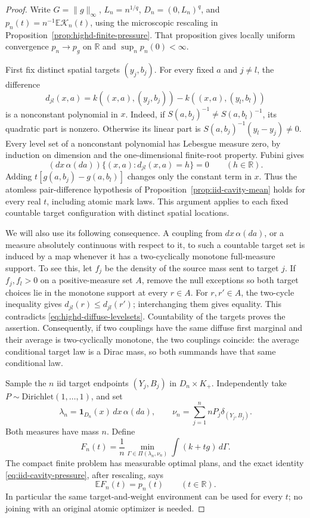 \documentclass[11pt,reqno]{amsart}
\theoremstyle{definition}
\theoremstyle{remark}
\numberwithin{equation}{section}
\newcommand{\R}{\mathbb R}
\newcommand{\E}{\mathbb E}
\begin{document}
\begin{proof}
Write \(G=\|g\|_\infty\), \(L_n=n^{1/q}\),
\(D_n=(0,L_n)^q\), and
\(p_n(t)=n^{-1}\E\mathcal K_n(t)\), using the microscopic
rescaling in Proposition~\ref{prop:highd-finite-pressure}.
That proposition gives locally uniform convergence
\(p_n\to p_g\) on \(\R\) and \(\sup_n p_n(0)<\infty\).

First fix distinct spatial targets \((y_j,b_j)\). For every fixed
\(a\) and \(j\ne l\), the difference
\[
 d_{jl}(x,a)=k((x,a),(y_j,b_j))-k((x,a),(y_l,b_l))
\]
is a nonconstant polynomial in \(x\). Indeed, if
\(S(a,b_j)^{-1}\ne S(a,b_l)^{-1}\), its quadratic part is
nonzero. Otherwise its linear part is
\(S(a,b_j)^{-1}(y_l-y_j)\ne0\). Every level set of a
nonconstant polynomial has Lebesgue measure zero, by induction on
dimension and the one-dimensional finite-root property. Fubini gives
\begin{equation}
 (dx\,\alpha(da))\{(x,a):d_{jl}(x,a)=h\}=0
 \qquad(h\in\R).
 \label{eq:highd-diffuse-levelsets}
\end{equation}
Adding \(t[g(a,b_j)-g(a,b_l)]\) changes only the constant term
in \(x\). Thus the atomless pair-difference hypothesis of
Proposition~\ref{prop:iid-cavity-mean} holds for every real \(t\),
including atomic mark laws. This argument applies to each fixed
countable target configuration with distinct spatial locations.

We will also use its following consequence. A coupling from
\(dx\,\alpha(da)\), or a measure absolutely continuous with respect
to it, to such a countable target set is induced by a map whenever
it has a two-cyclically monotone full-measure support. To see this,
let \(f_j\) be the density of the source mass sent to target \(j\).
If \(f_j,f_l>0\) on a positive-measure set \(A\), remove the null
exceptions so both target choices lie in the monotone support at
every \(r\in A\). For \(r,r'\in A\), the two-cycle inequality
gives \(d_{jl}(r)\le d_{jl}(r')\); interchanging them gives
equality. This contradicts \eqref{eq:highd-diffuse-levelsets}.
Countability of the targets proves the assertion. Consequently, if
two couplings have the same diffuse first marginal and their average
is two-cyclically monotone, the two couplings coincide: the average
conditional target law is a Dirac mass, so both summands have that
same conditional law.

Sample the \(n\) iid target endpoints \((Y_j,B_j)\) in
\(D_n\times K_+\). Independently take
\(P\sim\mathrm{Dirichlet}(1,\ldots,1)\), and set
\[
 \lambda_n=\mathbf1_{D_n}(x)\,dx\,\alpha(da),
 \qquad \nu_n=\sum_{j=1}^n nP_j\delta_{(Y_j,B_j)}.
\]
Both measures have mass \(n\). Define
\[
 F_n(t)=\frac1n\min_{\Gamma\in\Pi(\lambda_n,\nu_n)}
                \int(k+t g)\,d\Gamma.
\]
The compact finite problem has measurable optimal plans, and the
exact identity \eqref{eq:iid-cavity-pressure}, after rescaling, says
\begin{equation}
 \E F_n(t)=p_n(t)\qquad(t\in\R).
 \label{eq:highd-diffuse-value}
\end{equation}
In particular the same target-and-weight environment can be used for
every \(t\); no joining with an original atomic optimizer is needed.


\end{proof}
\end{document}
